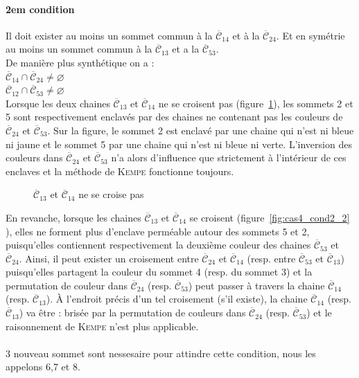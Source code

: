 \documentclass[french]{report}
\begin{document}
\paragraph{2em condition}
Il doit exister au moins un sommet commun à la $\overline{\mathcal{C}}_{14}$ et à la $\overline{\mathcal{C}}_{24}$. Et en symétrie au moins un sommet commun à la $\overline{\mathcal{C}}_{13}$ et a la $\overline{\mathcal{C}}_{53}$.\\
De manière plus synthétique on a :\\
$\overline{\mathcal{C}}_{14}\cap\overline{\mathcal{C}}_{24}\not=\varnothing$\\
$\overline{\mathcal{C}}_{12}\cap\overline{\mathcal{C}}_{53}\not=\varnothing$\\
Lorsque les deux chaines $\overline{\mathcal{C}}_{13}$ et $\overline{\mathcal{C}}_{14}$ ne se croisent pas (figure~\ref{fig:cas4_cond2_1}), les sommets 2 et 5 sont respectivement enclavés par des chaines ne contenant pas les couleurs de $\overline{\mathcal{C}}_{24}$ et $\overline{\mathcal{C}}_{53}$. Sur la figure, le sommet 2 est enclavé par une chaine qui n’est ni bleue ni jaune et le sommet 5 par une chaine qui n’est ni bleue ni verte. L’inversion des couleurs dans $\overline{\mathcal{C}}_{24}$ et $\overline{\mathcal{C}}_{53}$ n’a alors d’influence que strictement à l’intérieur de ces enclaves et la méthode de \textsc{Kempe} fonctionne toujours.\\

\begin{figure}[!ht]\centering
	\begin{changemargin}{-3cm}{-3cm}
		\begin{center}
			
			\caption{$\overline{\mathcal{C}}_{13}$ et $\overline{\mathcal{C}}_{14}$ ne se croise pas}\label{fig:cas4_cond2_1}
		\end{center}
	\end{changemargin}
\end{figure}
\FloatBarrier
En revanche, lorsque les chaines $\overline{\mathcal{C}}_{13}$ et $\overline{\mathcal{C}}_{14}$ se croisent (figure~\ref{fig:cas4_cond2_2} ), elles ne forment plus d’enclave perméable autour des sommets 5 et 2, puisqu’elles contiennent respectivement la deuxième couleur des chaines $\overline{\mathcal{C}}_{53}$ et $\overline{\mathcal{C}}_{24}$. Ainsi, il peut exister un croisement entre $\overline{\mathcal{C}}_{24}$ et $\overline{\mathcal{C}}_{14}$ (resp. entre $\overline{\mathcal{C}}_{53}$ et $\overline{\mathcal{C}}_{13}$) puisqu’elles partagent la couleur du sommet 4 (resp. du sommet 3) et la permutation de couleur dans $\overline{\mathcal{C}}_{24}$ (resp. $\overline{\mathcal{C}}_{53}$) peut passer à travers la chaine $\overline{\mathcal{C}}_{14}$ (resp. $\overline{\mathcal{C}}_{13}$). À l’endroit précis d’un tel croisement (s’il existe), la chaine $\overline{\mathcal{C}}_{14}$ (resp. $\overline{\mathcal{C}}_{13}$) va être :
brisée par la permutation de couleurs dans $\overline{\mathcal{C}}_{24}$ (resp. $\overline{\mathcal{C}}_{53}$) et le raisonnement de \textsc{Kempe} n’est plus applicable.\\
\\
3 nouveau sommet sont nessesaire pour attindre cette condition, nous les appelons 6,7 et 8.
\end{document}
